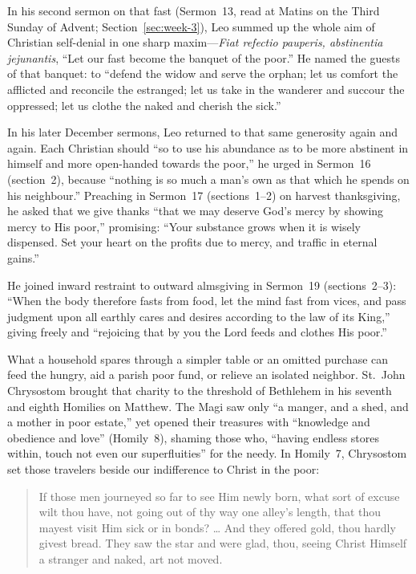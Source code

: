 In his second sermon on that fast (Sermon~13, read at Matins on the Third Sunday of Advent; Section~\ref{sec:week-3}), Leo summed up the whole aim of Christian self-denial in one sharp maxim---\textit{Fiat refectio pauperis, abstinentia jejunantis}, ``Let our fast become the banquet of the poor.'' He named the guests of that banquet: to ``defend the widow and serve the orphan; let us comfort the afflicted and reconcile the estranged; let us take in the wanderer and succour the oppressed; let us clothe the naked and cherish the sick.''

In his later December sermons, Leo returned to that same generosity again and again. Each Christian should ``so to use his abundance as to be more abstinent in himself and more open-handed towards the poor,'' he urged in Sermon~16 (section~2), because ``nothing is so much a man's own as that which he spends on his neighbour.'' Preaching in Sermon~17 (sections~1--2) on harvest thanksgiving, he asked that we give thanks ``that we may deserve God's mercy by showing mercy to His poor,'' promising: ``Your substance grows when it is wisely dispensed. Set your heart on the profits due to mercy, and traffic in eternal gains.''

He joined inward restraint to outward almsgiving in Sermon~19 (sections~2--3): ``When the body therefore fasts from food, let the mind fast from vices, and pass judgment upon all earthly cares and desires according to the law of its King,'' giving freely and ``rejoicing that by you the Lord feeds and clothes His poor.''

What a household spares through a simpler table or an omitted purchase can feed the hungry, aid a parish poor fund, or relieve an isolated neighbor. St.~John Chrysostom brought that charity to the threshold of Bethlehem in his seventh and eighth Homilies on Matthew. The Magi saw only ``a manger, and a shed, and a mother in poor estate,'' yet opened their treasures with ``knowledge and obedience and love'' (Homily~8), shaming those who, ``having endless stores within, touch not even our superfluities'' for the needy. In Homily~7, Chrysostom set those travelers beside our indifference to Christ in the poor:

\begin{quote}
If those men journeyed so far to see Him newly born, what sort of excuse wilt thou have, not going out of thy way one alley's length, that thou mayest visit Him sick or in bonds? \ldots{} And they offered gold, thou hardly givest bread. They saw the star and were glad, thou, seeing Christ Himself a stranger and naked, art not moved.
\end{quote}
